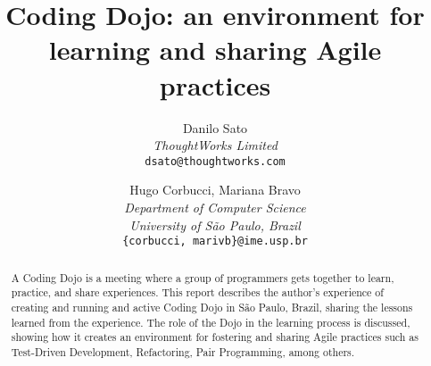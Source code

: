 \documentclass[times, 10pt,twocolumn]{article}
\begin{document}
\title{Coding Dojo: an environment for learning and sharing Agile practices}

\author{Danilo Sato\\
\textit{ThoughtWorks Limited}\\ 
{\tt dsato@thoughtworks.com}\\
\and
Hugo Corbucci, Mariana Bravo\\
\textit{Department of Computer Science}\\
\textit{University of São Paulo, Brazil}\\
{\tt \{corbucci, marivb\}@ime.usp.br}
}

\maketitle
\thispagestyle{empty}

\begin{abstract}
  A Coding Dojo is a meeting where a group of programmers gets together to learn, practice,
and share experiences. This report describes the author's experience of creating and running and
active Coding Dojo in São Paulo, Brazil, sharing the lessons learned from the experience.
The role of the Dojo in the learning process is discussed, showing how it creates an environment
for fostering and sharing Agile practices such as Test-Driven Development, Refactoring, Pair
Programming, among others.
\end{abstract}









\end{document}
